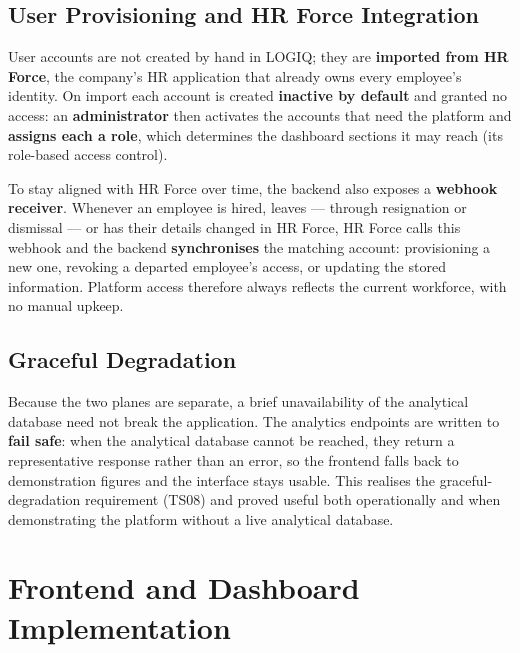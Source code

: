 \subsection{User Provisioning and HR Force Integration}

User accounts are not created by hand in LOGIQ; they are \textbf{imported from HR Force}, the company's
HR application that already owns every employee's identity. On import each account is created
\textbf{inactive by default} and granted no access: an \textbf{administrator} then activates the accounts
that need the platform and \textbf{assigns each a role}, which determines the dashboard sections it may
reach (its role-based access control).

To stay aligned with HR Force over time, the backend also exposes a \textbf{webhook receiver}. Whenever
an employee is hired, leaves --- through resignation or dismissal --- or has their details changed in HR
Force, HR Force calls this webhook and the backend \textbf{synchronises} the matching account:
provisioning a new one, revoking a departed employee's access, or updating the stored information.
Platform access therefore always reflects the current workforce, with no manual upkeep.

\subsection{Graceful Degradation}

Because the two planes are separate, a brief unavailability of the analytical database need not break
the application. The analytics endpoints are written to \textbf{fail safe}: when the analytical database
cannot be reached, they return a representative response rather than an error, so the frontend falls back
to demonstration figures and the interface stays usable. This realises the graceful-degradation
requirement (TS08) and proved useful both operationally and when demonstrating the platform without a
live analytical database.

\section{Frontend and Dashboard Implementation}
\label{sec:ch5-frontend}

